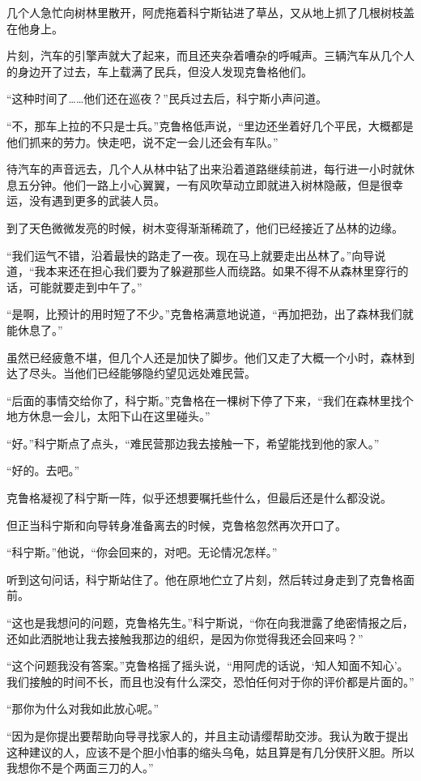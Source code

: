 几个人急忙向树林里散开，阿虎拖着科宁斯钻进了草丛，又从地上抓了几根树枝盖在他身上。

片刻，汽车的引擎声就大了起来，而且还夹杂着嘈杂的呼喊声。三辆汽车从几个人的身边开了过去，车上载满了民兵，但没人发现克鲁格他们。

“这种时间了……他们还在巡夜？”民兵过去后，科宁斯小声问道。

“不，那车上拉的不只是士兵。”克鲁格低声说，“里边还坐着好几个平民，大概都是他们抓来的劳力。快走吧，说不定一会儿还会有车队。”

待汽车的声音远去，几个人从林中钻了出来沿着道路继续前进，每行进一小时就休息五分钟。他们一路上小心翼翼，一有风吹草动立即就进入树林隐蔽，但是很幸运，没有遇到更多的武装人员。

到了天色微微发亮的时候，树木变得渐渐稀疏了，他们已经接近了丛林的边缘。

“我们运气不错，沿着最快的路走了一夜。现在马上就要走出丛林了。”向导说道，“我本来还在担心我们要为了躲避那些人而绕路。如果不得不从森林里穿行的话，可能就要走到中午了。”

“是啊，比预计的用时短了不少。”克鲁格满意地说道，“再加把劲，出了森林我们就能休息了。”

虽然已经疲惫不堪，但几个人还是加快了脚步。他们又走了大概一个小时，森林到达了尽头。当他们已经能够隐约望见远处难民营。

“后面的事情交给你了，科宁斯。”克鲁格在一棵树下停了下来，“我们在森林里找个地方休息一会儿，太阳下山在这里碰头。”

“好。”科宁斯点了点头，“难民营那边我去接触一下，希望能找到他的家人。”

“好的。去吧。”

克鲁格凝视了科宁斯一阵，似乎还想要嘱托些什么，但最后还是什么都没说。

但正当科宁斯和向导转身准备离去的时候，克鲁格忽然再次开口了。

“科宁斯。”他说，“你会回来的，对吧。无论情况怎样。”

听到这句问话，科宁斯站住了。他在原地伫立了片刻，然后转过身走到了克鲁格面前。

“这也是我想问的问题，克鲁格先生。”科宁斯说，“你在向我泄露了绝密情报之后，还如此洒脱地让我去接触我那边的组织，是因为你觉得我还会回来吗？”

“这个问题我没有答案。”克鲁格摇了摇头说，“用阿虎的话说，‘知人知面不知心’。我们接触的时间不长，而且也没有什么深交，恐怕任何对于你的评价都是片面的。”

“那你为什么对我如此放心呢。”

“因为是你提出要帮助向导寻找家人的，并且主动请缨帮助交涉。我认为敢于提出这种建议的人，应该不是个胆小怕事的缩头乌龟，姑且算是有几分侠肝义胆。所以我想你不是个两面三刀的人。”

